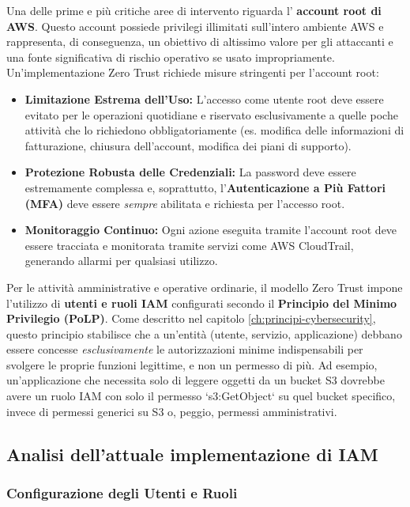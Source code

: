 Una delle prime e più critiche aree di intervento riguarda l' \textbf{account root di AWS}. Questo account possiede privilegi illimitati sull'intero ambiente AWS e rappresenta, di conseguenza, un obiettivo di altissimo valore per gli attaccanti e una fonte significativa di rischio operativo se usato impropriamente. Un'implementazione Zero Trust richiede misure stringenti per l'account root:
\begin{itemize}
    \item \textbf{Limitazione Estrema dell'Uso:} L'accesso come utente root deve essere evitato per le operazioni quotidiane e riservato esclusivamente a quelle poche attività che lo richiedono obbligatoriamente (es. modifica delle informazioni di fatturazione, chiusura dell'account, modifica dei piani di supporto).
    \item \textbf{Protezione Robusta delle Credenziali:} La password deve essere estremamente complessa e, soprattutto, l'\textbf{Autenticazione a Più Fattori (MFA)} deve essere \textit{sempre} abilitata e richiesta per l'accesso root.
    \item \textbf{Monitoraggio Continuo:} Ogni azione eseguita tramite l'account root deve essere tracciata e monitorata tramite servizi come AWS CloudTrail, generando allarmi per qualsiasi utilizzo.
\end{itemize}

Per le attività amministrative e operative ordinarie, il modello Zero Trust impone l'utilizzo di \textbf{utenti e ruoli IAM} configurati secondo il \textbf{Principio del Minimo Privilegio (PoLP)}. Come descritto nel capitolo \ref{ch:principi-cybersecurity}, questo principio stabilisce che a un'entità (utente, servizio, applicazione) debbano essere concesse \textit{esclusivamente} le autorizzazioni minime indispensabili per svolgere le proprie funzioni legittime, e non un permesso di più. Ad esempio, un'applicazione che necessita solo di leggere oggetti da un bucket S3 dovrebbe avere un ruolo IAM con solo il permesso `s3:GetObject` su quel bucket specifico, invece di permessi generici su S3 o, peggio, permessi amministrativi.
\subsection{Analisi dell'attuale implementazione di IAM}
\subsubsection{Configurazione degli Utenti e Ruoli}

